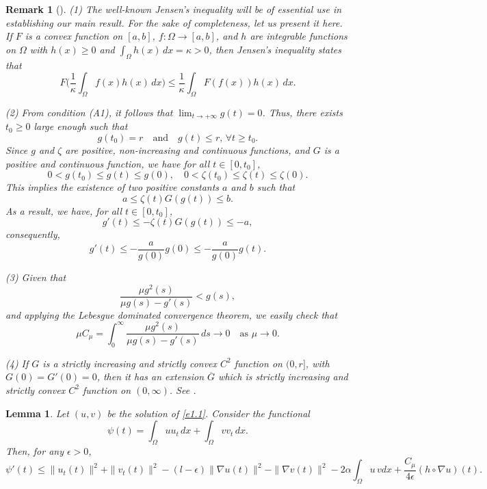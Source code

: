 \documentclass[11pt]{article}
\numberwithin{equation}{section}
\newtheorem{lemma}[theorem]{Lemma}
\newtheorem{remark}[theorem]{Remark}
\begin{document}
\begin{remark}[\cite{MustafaMuhammadR}] \label{rmk6} \rm
(1) The well-known Jensen's inequality will be of essential use in establishing our
 main result. For the sake of completeness, let us present it here.
 If \( F \) is a convex function on \( [a, b] \), \( f : \Omega \to [a, b] \), and
 \( h \) are integrable functions on \( \Omega \) with
 \( h(x) \geq 0 \) and $\int_\Omega h(x)\,dx = \kappa > 0$,
then Jensen's inequality states that
\[
F\Big( \frac{1}{\kappa} \int_\Omega f(x) h(x)\,dx \Big)
\leq \frac{1}{\kappa} \int_\Omega F(f(x)) h(x)\,dx.
\]

(2) From condition (A1), it follows that $ \lim_{t \to +\infty} g(t) = 0$.
Thus, there exists \( t_0 \geq 0 \) large enough such that
\[
g(t_0) = r \quad \text{and} \quad g(t) \leq r, \, \forall t \geq t_0.
\]
Since $g$ and $\zeta$ are positive, non-increasing and continuous functions, and
$G$ is a positive and continuous function, we have for all \( t \in [0, t_0] \),
\[
0 < g(t_0) \leq g(t) \leq g(0), \quad 0 < \zeta(t_0) \leq \zeta(t) \leq \zeta(0).
\]
This implies the existence of two positive constants \( a \) and \( b \) such that
\[
a \leq \zeta(t) G(g(t)) \leq b.
\]
As a result, we have, for all \( t \in [0, t_0] \),
\[
g'(t) \leq -\zeta(t) G(g(t)) \leq -a,
\]
consequently,
\[
g'(t) \leq -\frac{a}{g(0)} g(0) \leq -\frac{a}{g(0)} g(t). \label{e4.7}
\]

(3) Given that
\[
\frac{\mu g^2(s)}{\mu g(s) - g'(s)} < g(s),
\]
and applying the Lebesgue dominated convergence theorem, we easily check that
\[
\mu C_\mu = \int_0^\infty \frac{\mu g^2(s)}{\mu g(s) - g'(s)} \, ds \to 0
\quad \text{as } \mu \to 0.
\]

(4) If $G$ is a strictly increasing and strictly convex $C^2$ function on $(0, r]$,
with $G(0) = G'(0) = 0$, then it has an extension $\overline{G}$ which is strictly
increasing and strictly convex $C^2$ function on $(0, \infty)$.
See \cite{MustafaMuhammadR}.
\end{remark}

\begin{lemma} \label{lem7}
Let $(u,v)$ be the solution of \eqref{e1.1}. Consider the functional
\[
 \psi(t) = \int_{\Omega} uu_t \, dx +\int_{\Omega} vv_t \, dx.
\]
Then, for any \(\epsilon > 0\),
\begin{equation}
 \psi '(t) \leq \| u_t(t) \|^2 +\| v_t(t) \|^2 - (l-\epsilon) \| \nabla u(t) \|^2 - \| \nabla v (t)\|^2 -2 \alpha \int_{\Omega} u \, v dx + \frac{ C_\mu }{4\epsilon} (h \circ \nabla u)(t).
 \label{e4.8}
\end{equation}
\end{lemma}
\end{document}
